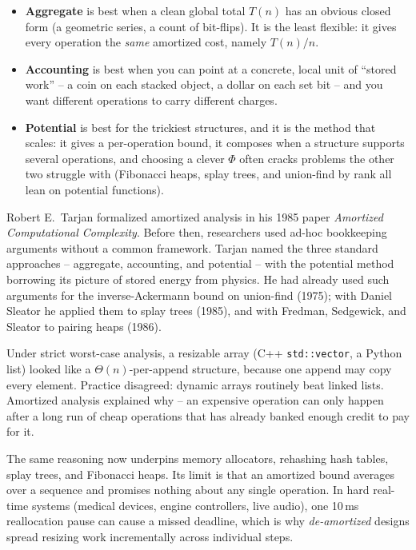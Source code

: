 \begin{itemize}
  \item \textbf{Aggregate} is best when a clean global total $T(n)$ has an obvious
        closed form (a geometric series, a count of bit-flips). It is the least
        flexible: it gives every operation the \emph{same} amortized cost, namely
        $T(n)/n$.
  \item \textbf{Accounting} is best when you can point at a concrete, local unit of
        ``stored work'' -- a coin on each stacked object, a dollar on each set bit
        -- and you want different operations to carry different charges.
  \item \textbf{Potential} is best for the trickiest structures, and it is the
        method that scales: it gives a per-operation bound, it composes when a
        structure supports several operations, and choosing a clever $\Phi$ often
        cracks problems the other two struggle with (Fibonacci heaps, splay trees,
        and union-find by rank all lean on potential functions).
\end{itemize}

\begin{historybox}
Robert E.~Tarjan formalized amortized analysis in his 1985 paper \emph{Amortized Computational Complexity}. Before then, researchers used ad-hoc bookkeeping arguments without a common framework. Tarjan named the three standard approaches -- aggregate, accounting, and potential -- with the potential method borrowing its picture of stored energy from physics. He had already used such arguments for the inverse-Ackermann bound on union-find (1975); with Daniel Sleator he applied them to splay trees (1985), and with Fredman, Sedgewick, and Sleator to pairing heaps (1986).

Under strict worst-case analysis, a resizable array (C++ \lstinline|std::vector|, a Python list) looked like a $\Theta(n)$-per-append structure, because one append may copy every element. Practice disagreed: dynamic arrays routinely beat linked lists. Amortized analysis explained why -- an expensive operation can only happen after a long run of cheap operations that has already banked enough credit to pay for it.

The same reasoning now underpins memory allocators, rehashing hash tables, splay trees, and Fibonacci heaps. Its limit is that an amortized bound averages over a sequence and promises nothing about any single operation. In hard real-time systems (medical devices, engine controllers, live audio), one 10\,ms reallocation pause can cause a missed deadline, which is why \emph{de-amortized} designs spread resizing work incrementally across individual steps.
\end{historybox}

